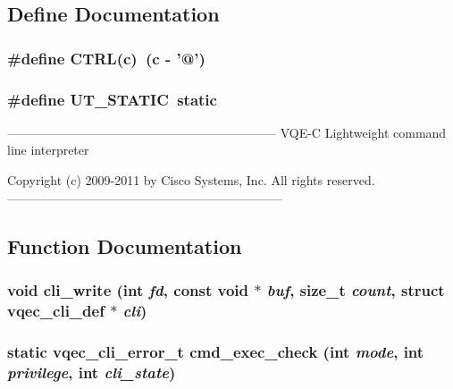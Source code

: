 \subsection{Define Documentation}
\subsubsection{\setlength{\rightskip}{0pt plus 5cm}\#define CTRL(c)~(c - '@')}\label{vqec__cli_8c_ce556068ea6a47ea6fea51e73b84d5e8}


\subsubsection{\setlength{\rightskip}{0pt plus 5cm}\#define UT\_\-STATIC~static}\label{vqec__cli_8c_840be0a802b42af3ce4430a7173caa40}


----------------------------------------------------------------- VQE-C Lightweight command line interpreter

Copyright (c) 2009-2011 by Cisco Systems, Inc. All rights reserved. ------------------------------------------------------------------ 

\subsection{Function Documentation}
\subsubsection{\setlength{\rightskip}{0pt plus 5cm}void cli\_\-write (int {\em fd}, const void $\ast$ {\em buf}, size\_\-t {\em count}, struct \bf{vqec\_\-cli\_\-def} $\ast$ {\em cli})}\label{vqec__cli_8c_5f7d68a828813b1c9a31ad9a429bb53c}


\subsubsection{\setlength{\rightskip}{0pt plus 5cm}static \bf{vqec\_\-cli\_\-error\_\-t} cmd\_\-exec\_\-check (int {\em mode}, int {\em privilege}, int {\em cli\_\-state})\hspace{0.3cm}{\tt  [static]}}\label{vqec__cli_8c_5c4c188f9313cf4648486b112c33ee21}


